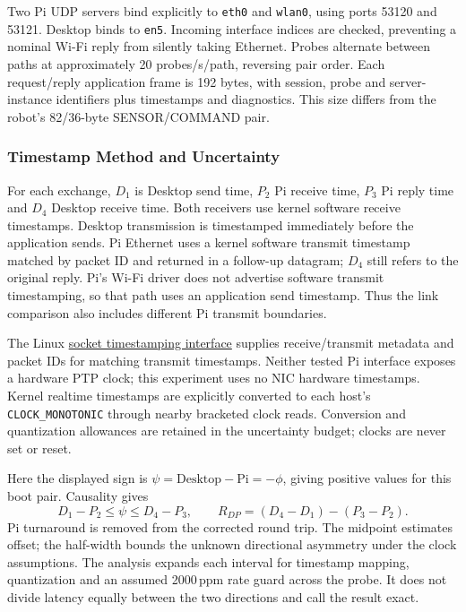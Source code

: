 Two Pi UDP servers bind explicitly to \texttt{eth0} and \texttt{wlan0}, using ports 53120 and 53121. Desktop binds to \texttt{en5}. Incoming interface indices are checked, preventing a nominal Wi-Fi reply from silently taking Ethernet. Probes alternate between paths at approximately 20 probes/s/path, reversing pair order. Each request/reply application frame is 192 bytes, with session, probe and server-instance identifiers plus timestamps and diagnostics. This size differs from the robot's 82/36-byte SENSOR/COMMAND pair.

\subsubsection{Timestamp Method and Uncertainty}
For each exchange, $D_1$ is Desktop send time, $P_2$ Pi receive time, $P_3$ Pi reply time and $D_4$ Desktop receive time. Both receivers use kernel software receive timestamps. Desktop transmission is timestamped immediately before the application sends. Pi Ethernet uses a kernel software transmit timestamp matched by packet ID and returned in a follow-up datagram; $D_4$ still refers to the original reply. Pi's Wi-Fi driver does not advertise software transmit timestamping, so that path uses an application send timestamp. Thus the link comparison also includes different Pi transmit boundaries.

The Linux \href{https://docs.kernel.org/networking/timestamping.html}{socket timestamping interface} supplies receive/transmit metadata and packet IDs for matching transmit timestamps. Neither tested Pi interface exposes a hardware PTP clock; this experiment uses no NIC hardware timestamps. Kernel realtime timestamps are explicitly converted to each host's \texttt{CLOCK\_MONOTONIC} through nearby bracketed clock reads. Conversion and quantization allowances are retained in the uncertainty budget; clocks are never set or reset.

Here the displayed sign is $\psi=\text{Desktop}-\text{Pi}=-\phi$, giving positive values for this boot pair. Causality gives
\begin{equation}
 D_1-P_2\leq\psi\leq D_4-P_3,
 \qquad R_{DP}=(D_4-D_1)-(P_3-P_2).
\end{equation}
Pi turnaround is removed from the corrected round trip. The midpoint estimates offset; the half-width bounds the unknown directional asymmetry under the clock assumptions. The analysis expands each interval for timestamp mapping, quantization and an assumed 2000\,ppm rate guard across the probe. It does not divide latency equally between the two directions and call the result exact.

